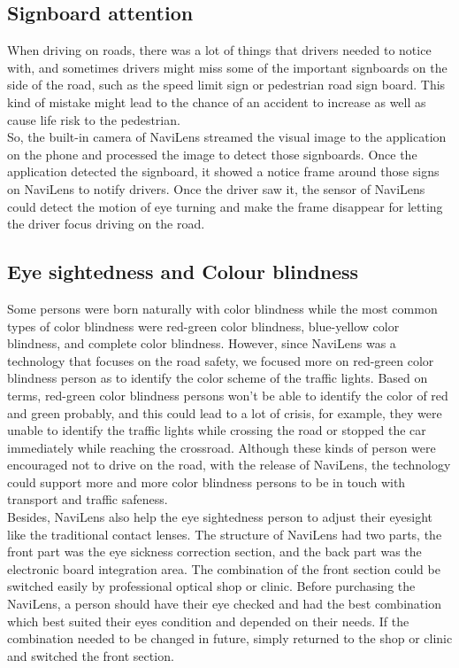 \documentclass{chi-ext}
\begin{document}
\begin{multicols}{2}
\subsection{Signboard attention}
When driving on roads, there was a lot of things that drivers needed to notice with, and sometimes drivers might miss some of the important signboards on the side of the road, such as the speed limit sign or pedestrian road sign board. This kind of mistake might lead to the chance of an accident to increase as well as cause life risk to the pedestrian.\\

So, the built-in camera of NaviLens streamed the visual image to the application on the phone and processed the image to detect those signboards. Once the application detected the signboard, it showed a notice frame around those signs on NaviLens to notify drivers. Once the driver saw it, the sensor of NaviLens could detect the motion of eye turning and make the frame disappear for letting the driver focus driving on the road.\\

\subsection{Eye sightedness and Colour blindness}

Some persons were born naturally with color blindness while the most common types of color blindness were red-green color blindness, blue-yellow color blindness, and complete color blindness. However, since NaviLens was a technology that focuses on the road safety, we focused more on red-green color blindness person as to identify the color scheme of the traffic lights. Based on terms, red-green color blindness persons won’t be able to identify the color of red and green probably, and this could lead to a lot of crisis, for example, they were unable to identify the traffic lights while crossing the road or stopped the car immediately while reaching the crossroad. Although these kinds of person were encouraged not to drive on the road, with the release of NaviLens, the technology could support more and more color blindness persons to be in touch with transport and traffic safeness.\\

Besides, NaviLens also help the eye sightedness person to adjust their eyesight like the traditional contact lenses. The structure of NaviLens had two parts, the front part was the eye sickness correction section, and the back part was the electronic board integration area. The combination of the front section could be switched easily by professional optical shop or clinic. Before purchasing the NaviLens, a person should have their eye checked and had the best combination which best suited their eyes condition and depended on their needs. If the combination needed to be changed in future, simply returned to the shop or clinic and switched the front section.\\


\end{multicols}
\end{document}
